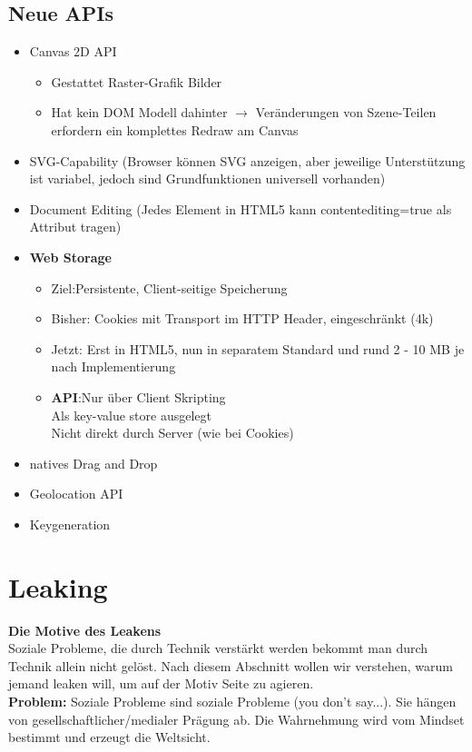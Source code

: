 \documentclass{article} %
\begin{document}
		\subsection{Neue APIs}
		\begin{itemize}
			\item Canvas 2D API
			\begin{itemize}
				\item Gestattet Raster-Grafik Bilder
				\item Hat kein DOM Modell dahinter $\rightarrow$ Veränderungen von Szene-Teilen erfordern ein komplettes Redraw am Canvas
			\end{itemize}
			\item SVG-Capability (Browser können SVG anzeigen, aber jeweilige Unterstützung ist variabel, jedoch sind Grundfunktionen universell vorhanden)
			\item Document Editing (Jedes Element in HTML5 kann contentediting=true als Attribut tragen)
			\item \textbf{Web Storage}
			\begin{itemize}
				\item Ziel:Persistente, Client-seitige Speicherung
				\item Bisher: Cookies mit Transport im HTTP Header, eingeschränkt (4k)
				\item Jetzt: Erst in HTML5, nun in separatem Standard und rund 2 - 10 MB je nach Implementierung
				\item \textbf{API}:Nur über Client Skripting\\
				Als key-value store ausgelegt\\
				Nicht direkt durch Server (wie bei Cookies)
			\end{itemize}
			\item natives Drag and Drop
			\item Geolocation API
			\item Keygeneration
		\end{itemize}
\section{Leaking}
\textbf{Die Motive des Leakens}\\
Soziale Probleme, die durch Technik verstärkt werden bekommt man durch Technik allein nicht gelöst.
Nach diesem Abschnitt wollen wir verstehen, warum jemand leaken will, um auf der Motiv Seite zu agieren.\\
\textbf{Problem: } Soziale Probleme sind soziale Probleme (you don't say...). Sie hängen von gesellschaftlicher/medialer Prägung ab. 
Die Wahrnehmung wird vom Mindset bestimmt und erzeugt die Weltsicht.
\end{document}
